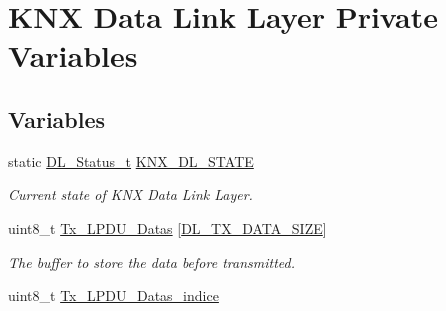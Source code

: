 \hypertarget{group___k_n_x___d_l___private___variables}{}\section{K\+NX Data Link Layer Private Variables}
\label{group___k_n_x___d_l___private___variables}
\subsection*{Variables}
\begin{DoxyCompactItemize}
\item 
static \hyperlink{group___k_n_x___d_l___exported___types_ga143539be3680d9b7f990a9dfe1df40fe}{D\+L\+\_\+\+Status\+\_\+t} \hyperlink{group___k_n_x___d_l___private___variables_gacea80ec8cf0e99ebe15e3205b7d273a9}{K\+N\+X\+\_\+\+D\+L\+\_\+\+S\+T\+A\+TE}\hypertarget{group___k_n_x___d_l___private___variables_gacea80ec8cf0e99ebe15e3205b7d273a9}{}\label{group___k_n_x___d_l___private___variables_gacea80ec8cf0e99ebe15e3205b7d273a9}

\begin{DoxyCompactList}\small\item\em Current state of K\+NX Data Link Layer. \end{DoxyCompactList}\item 
uint8\+\_\+t \hyperlink{group___k_n_x___d_l___private___variables_ga441254f25e6b7d0eabfadce35a1e1465}{Tx\+\_\+\+L\+P\+D\+U\+\_\+\+Datas} \mbox{[}\hyperlink{group___d_l___exported___constants_gae7b01d80da6448f1b4eea77823660d3c}{D\+L\+\_\+\+T\+X\+\_\+\+D\+A\+T\+A\+\_\+\+S\+I\+ZE}\mbox{]}\hypertarget{group___k_n_x___d_l___private___variables_ga441254f25e6b7d0eabfadce35a1e1465}{}\label{group___k_n_x___d_l___private___variables_ga441254f25e6b7d0eabfadce35a1e1465}

\begin{DoxyCompactList}\small\item\em The buffer to store the data before transmitted. \end{DoxyCompactList}\item 
uint8\+\_\+t \hyperlink{group___k_n_x___d_l___private___variables_ga82d121f021629e9ff59b8a713a46e49b}{Tx\+\_\+\+L\+P\+D\+U\+\_\+\+Datas\+\_\+indice}\hypertarget{group___k_n_x___d_l___private___variables_ga82d121f021629e9ff59b8a713a46e49b}{}\label{group___k_n_x___d_l___private___variables_ga82d121f021629e9ff59b8a713a46e49b}


\end{DoxyCompactItemize}

